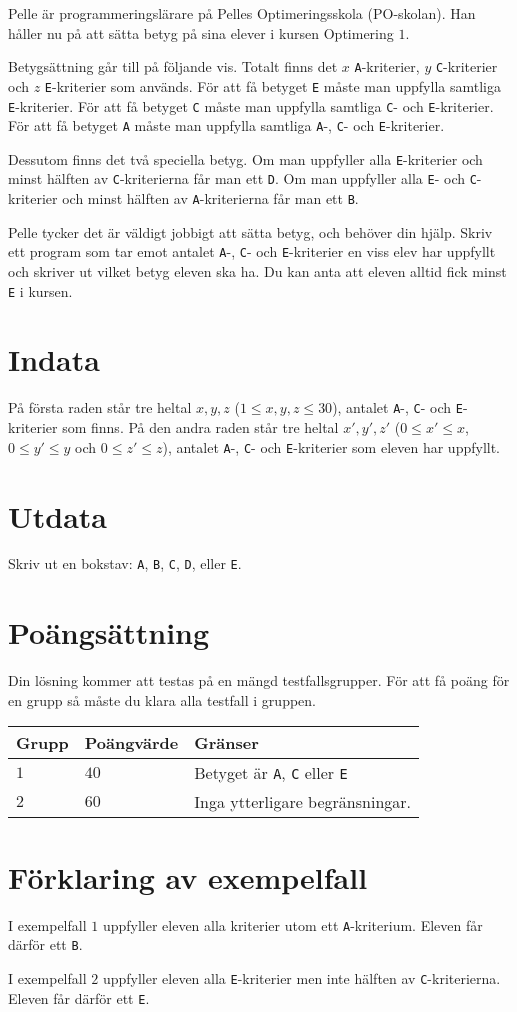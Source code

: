Pelle är programmeringslärare på Pelles Optimeringsskola (PO-skolan).
Han håller nu på att sätta betyg på sina elever i kursen Optimering $1$.

Betygsättning går till på följande vis.
Totalt finns det $x$ \texttt{A}-kriterier, $y$ \texttt{C}-kriterier och $z$ \texttt{E}-kriterier som används.
För att få betyget \texttt{E} måste man uppfylla samtliga \texttt{E}-kriterier.
För att få betyget \texttt{C} måste man uppfylla samtliga \texttt{C}- och \texttt{E}-kriterier.
För att få betyget \texttt{A} måste man uppfylla samtliga \texttt{A}-, \texttt{C}- och \texttt{E}-kriterier.

Dessutom finns det två speciella betyg.
Om man uppfyller alla \texttt{E}-kriterier och minst hälften av \texttt{C}-kriterierna får man ett \texttt{D}.
Om man uppfyller alla \texttt{E}- och \texttt{C}-kriterier och minst hälften av \texttt{A}-kriterierna får man ett \texttt{B}.

Pelle tycker det är väldigt jobbigt att sätta betyg, och behöver din hjälp.
Skriv ett program som tar emot antalet \texttt{A}-, \texttt{C}- och \texttt{E}-kriterier en viss elev har uppfyllt och skriver ut vilket betyg eleven ska ha.
Du kan anta att eleven alltid fick minst \texttt{E} i kursen.

\section*{Indata}
På första raden står tre heltal $x, y, z$ ($1 \leq x, y, z \leq 30$), antalet \texttt{A}-, \texttt{C}- och \texttt{E}-kriterier som finns.
På den andra raden står tre heltal $x', y', z'$ ($0 \leq x' \leq x$, $0 \leq y' \leq y$ och $0 \leq z' \leq z$), antalet \texttt{A}-, \texttt{C}- och \texttt{E}-kriterier som eleven har uppfyllt.

\section*{Utdata}
Skriv ut en bokstav: \texttt{A}, \texttt{B}, \texttt{C}, \texttt{D}, eller \texttt{E}.

\section*{Poängsättning}
Din lösning kommer att testas på en mängd testfallsgrupper.
För att få poäng för en grupp så måste du klara alla testfall i gruppen.

\noindent
\begin{tabular}{| l | l | l |}
\hline
Grupp & Poängvärde & Gränser \\ \hline
$1$     & $40$        &  Betyget är \texttt{A}, \texttt{C} eller \texttt{E} \\ \hline 
$2$     & $60$        &  Inga ytterligare begränsningar. \\ \hline
\end{tabular}

\section*{Förklaring av exempelfall}
I exempelfall $1$ uppfyller eleven alla kriterier utom ett \texttt{A}-kriterium. Eleven får därför ett \texttt{B}.

I exempelfall $2$ uppfyller eleven alla \texttt{E}-kriterier men inte hälften av \texttt{C}-kriterierna. Eleven får därför ett \texttt{E}.

